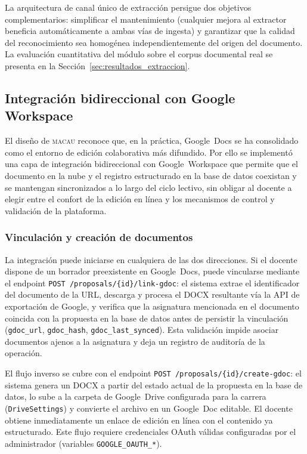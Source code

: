 La arquitectura de canal \'{u}nico de extracci\'{o}n persigue dos objetivos
complementarios: simplificar el mantenimiento (cualquier mejora al extractor
beneficia autom\'{a}ticamente a ambas v\'{i}as de ingesta) y garantizar que la
calidad del reconocimiento sea homog\'{e}nea independientemente del origen del
documento. La evaluaci\'{o}n cuantitativa del m\'{o}dulo sobre el corpus
documental real se presenta en la Secci\'{o}n~\ref{sec:resultados_extraccion}.

\subsection{Integraci\'{o}n bidireccional con Google Workspace}
\label{subsec:gdocs_sync}

El dise\~{n}o de \textsc{macau} reconoce que, en la pr\'{a}ctica, Google~Docs se ha consolidado como el entorno de edici\'{o}n
colaborativa m\'{a}s difundido. Por ello se implement\'{o} una capa de
integraci\'{o}n bidireccional con Google~Workspace que permite que el documento
en la nube y el registro estructurado en la base de datos coexistan y se
mantengan sincronizados a lo largo del ciclo lectivo, sin obligar al docente a
elegir entre el confort de la edici\'{o}n en l\'{i}nea y los mecanismos de
control y validaci\'{o}n de la plataforma.

\subsubsection{Vinculaci\'{o}n y creaci\'{o}n de documentos}
\label{subsubsec:gdoc_link}

La integraci\'{o}n puede iniciarse en cualquiera de las dos direcciones.
Si el docente dispone de un borrador preexistente en Google~Docs, puede
vincularse mediante el endpoint \texttt{POST /propo\-sals/\{id\}/link-gdoc}:
el sistema extrae el identificador del documento de la URL, descarga y procesa el DOCX
resultante vía la API de exportaci\'{o}n de Google, y verifica que la
asignatura mencionada en el documento coincida con la propuesta en la base
de datos antes de persistir la vinculaci\'{o}n (\texttt{gdoc\_url},
\texttt{gdoc\_hash}, \texttt{gdoc\_last\_synced}). Esta validaci\'{o}n
impide asociar documentos ajenos a la asignatura y deja un registro de
auditor\'{i}a de la operaci\'{o}n.

El flujo inverso se cubre con el endpoint
\texttt{POST /propo\-sals/\{id\}/create-gdoc}: el sistema genera un DOCX a
partir del estado actual de la propuesta en la base de datos, lo sube a la
carpeta de Google~Drive configurada para la carrera (\texttt{DriveSettings})
y convierte el archivo en un Google~Doc editable. El docente obtiene
inmediatamente un enlace de edici\'{o}n en l\'{i}nea con el contenido ya
estructurado. Este flujo requiere credenciales OAuth v\'{a}lidas configuradas
por el administrador (variables \texttt{GOOGLE\_OAUTH\_*}).

